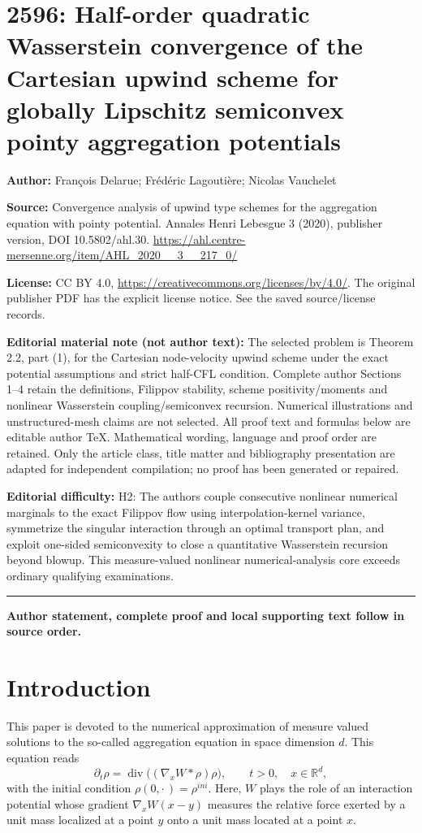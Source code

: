 \documentclass[11pt]{article}
\theoremstyle{definition}
\numberwithin{equation}{section}
\DeclareMathOperator{\dv}{div}
\newcommand*\RR{\mathbb{R}}
\newcommand*\pa{\partial}
\begin{document}
\section*{2596: Half-order quadratic Wasserstein convergence of the Cartesian upwind scheme for globally Lipschitz semiconvex pointy aggregation potentials}
\noindent\textbf{Author:} François Delarue; Frédéric Lagoutière; Nicolas Vauchelet\par\noindent\textbf{Source:} Convergence analysis of upwind type schemes for the aggregation equation with pointy potential. Annales Henri Lebesgue 3 (2020), publisher version, DOI 10.5802/ahl.30. \url{https://ahl.centre-mersenne.org/item/AHL_2020__3__217_0/}
\par\noindent\textbf{License:} CC BY 4.0, \url{https://creativecommons.org/licenses/by/4.0/}. The original publisher PDF has the explicit license notice. See the saved source/license records.
\par\noindent\textbf{Editorial material note (not author text):} The selected problem is Theorem 2.2, part (1), for the Cartesian node-velocity upwind scheme under the exact potential assumptions and strict half-CFL condition. Complete author Sections 1--4 retain the definitions, Filippov stability, scheme positivity/moments and nonlinear Wasserstein coupling/semiconvex recursion. Numerical illustrations and unstructured-mesh claims are not selected. All proof text and formulas below are editable author TeX. Mathematical wording, language and proof order are retained. Only the article class, title matter and bibliography presentation are adapted for independent compilation; no proof has been generated or repaired.
\par\noindent\textbf{Editorial difficulty:} H2: The authors couple consecutive nonlinear numerical marginals to the exact Filippov flow using interpolation-kernel variance, symmetrize the singular interaction through an optimal transport plan, and exploit one-sided semiconvexity to close a quantitative Wasserstein recursion beyond blowup. This measure-valued nonlinear numerical-analysis core exceeds ordinary qualifying examinations.
\medskip\hrule\medskip
\noindent\textbf{Author statement, complete proof and local supporting text follow in source order.}
\section{Introduction}

This paper is devoted to the numerical approximation of measure valued solutions to the so-called aggregation equation in space dimension $d$. This equation reads
\begin{equation}\label{EqInter}
\pa_t\rho = \dv\big((\nabla_x W*\rho) \rho\big), \qquad t>0,\quad x\in\RR^d,
\end{equation}
with the initial condition $\rho(0,{\cdot\,})=\rho^{ini}$. Here, $W$ plays the role of an interaction potential whose gradient $\nabla_x W(x-y)$ measures the relative force exerted by a unit mass localized at a point $y$ onto a unit mass located at a point $x$.
\end{document}
